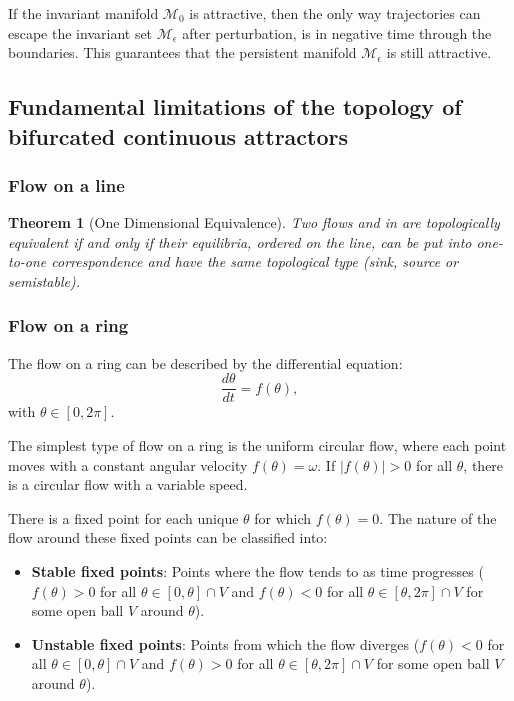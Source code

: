 \documentclass{article} %
\newcounter{ct}
\newcommand{\manifold}{\mathcal{M}}
\newtheorem{theorem}{Theorem}
\theoremstyle{definition}
\theoremstyle{remark}
\begin{document}
If the invariant manifold \(\manifold_{0}\) is attractive, then the only way trajectories can escape the invariant set \(\manifold_{\epsilon}\) after perturbation, is in negative time through the boundaries.
This guarantees that the persistent manifold \(\manifold_{\epsilon}\) is still attractive.


\subsection{Fundamental limitations of the topology of bifurcated continuous attractors}


\subsubsection{Flow on a line}
\begin{theorem}[One Dimensional Equivalence]
Two flows and in are topologically equivalent if and only if their equilibria, ordered on the line, can be put into one-to-one correspondence and have the same topological type (sink, source or semistable).
\end{theorem}

\subsubsection{Flow on a ring}
The flow on a ring can be described by the differential equation\citep{hirsch2013differential}:
\begin{equation}
\frac{d\theta}{dt} = f(\theta),
\end{equation}with \(\theta\in[0, 2\pi].\)

The simplest type of flow on a ring is the uniform circular flow, where each point moves with a constant angular velocity \(f(\theta)=\omega\).
If \(|f(\theta)|>0\) for all \(\theta\), there is a circular flow with a variable speed.

There is a fixed point for each unique \(\theta\) for which \(f(\theta)=0\).
The nature of the flow around these fixed points can be classified into:
\begin{itemize}
\item\textbf{Stable fixed points}: Points where the flow tends to as time progresses (\(f(\theta)>0\) for all \( \theta\in[0,\theta]\cap V\) and \(f(\theta)<0\) for all \( \theta\in[\theta, 2\pi]\cap V\) for some open ball \(V\) around \(\theta\)).
\item\textbf{Unstable fixed points}: Points from which the flow diverges (\(f(\theta)<0\) for all \( \theta\in[0,\theta]\cap V\) and \(f(\theta)>0\) for all \( \theta\in[\theta, 2\pi]\cap V\) for some open ball \(V\) around \(\theta\)).
\end{itemize}
\end{document}

